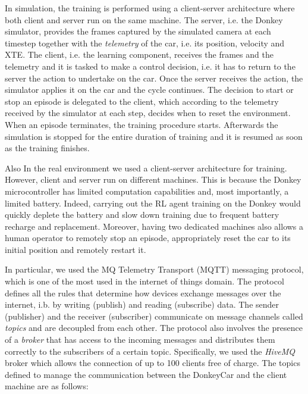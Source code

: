 In simulation, the training is performed using a client-server architecture where both client and server run on the same machine. The server, i.e. the Donkey simulator, provides the frames captured by the simulated camera at each timestep together with the \textit{telemetry} of the car, i.e. its position, velocity and XTE. The client, i.e. the learning component, receives the frames and the telemetry and it is tasked to make a control decision, i.e. it has to return to the server the action to undertake on the car. Once the server receives the action, the simulator applies it on the car and the cycle continues. The decision to start or stop an episode is delegated to the client, which according to the telemetry received by the simulator at each step, decides when to reset the environment. When an episode terminates, the training procedure starts. Afterwards the simulation is stopped for the entire duration of training and it is resumed as soon as the training finishes.

Also In the real environment we used a client-server architecture for training. However, client and server run on different machines. This is because the Donkey microcontroller has limited computation capabilities and, most importantly, a limited battery. Indeed, carrying out the RL agent training on the Donkey would quickly deplete the battery and slow down training due to frequent battery recharge and replacement. Moreover, having two dedicated machines also allows a human operator to remotely stop an episode, appropriately reset the car to its initial position and remotely restart it.

In particular, we used the MQ Telemetry Transport (MQTT) messaging protocol, which is one of the most used in the internet of things domain. The protocol defines all the rules that determine how devices exchange messages over the internet, i.b. by writing (publish) and reading (subscribe) data. The sender (publisher) and the receiver (subscriber) communicate on message channels called \textit{topics} and are decoupled from each other. The protocol also involves the presence of a \textit{broker} that has access to the incoming messages and distributes them correctly to the subscribers of a certain topic. Specifically, we used the \textit{HiveMQ} broker which allows the connection of up to 100 clients free of charge. The topics defined to manage the communication between the DonkeyCar and the client machine are as follows:

